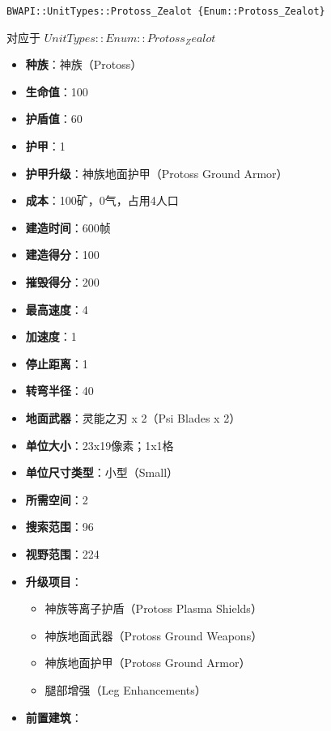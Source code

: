 \begin{tcolorbox}[colback=white, colframe=black!60!white, title=Protoss\_Zealot(), arc=0mm]
    \begin{verbatim}
BWAPI::UnitTypes::Protoss_Zealot {Enum::Protoss_Zealot}
    \end{verbatim}
    对应于  $ UnitTypes::Enum::Protoss_Zealot $ 
    \begin{itemize}
        \item \textbf{种族}：神族（Protoss）
        \item \textbf{生命值}：100
        \item \textbf{护盾值}：60
        \item \textbf{护甲}：1
        \item \textbf{护甲升级}：神族地面护甲（Protoss Ground Armor）
        \item \textbf{成本}：100矿，0气，占用4人口
        \item \textbf{建造时间}：600帧
        \item \textbf{建造得分}：100
        \item \textbf{摧毁得分}：200
        \item \textbf{最高速度}：4
        \item \textbf{加速度}：1
        \item \textbf{停止距离}：1
        \item \textbf{转弯半径}：40
        \item \textbf{地面武器}：灵能之刃 x 2（Psi Blades x 2）
        \item \textbf{单位大小}：23x19像素；1x1格
        \item \textbf{单位尺寸类型}：小型（Small）
        \item \textbf{所需空间}：2
        \item \textbf{搜索范围}：96
        \item \textbf{视野范围}：224
        \item \textbf{升级项目}：
            \begin{itemize}
                \item 神族等离子护盾（Protoss Plasma Shields）
                \item 神族地面武器（Protoss Ground Weapons）
                \item 神族地面护甲（Protoss Ground Armor）
                \item 腿部增强（Leg Enhancements）
            \end{itemize}
        \item \textbf{前置建筑}：

\end{itemize}
\end{tcolorbox}
